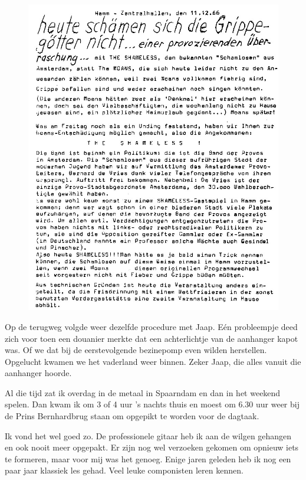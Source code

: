 \documentclass[10pt,twoside, openright]{memoir}
\begin{document}
\begin{figure}
\includegraphics[width=\textwidth]{img/ch30/schamensich}
\end{figure}

Op de terugweg volgde weer dezelfde procedure met Jaap. Eén probleempje deed zich voor toen een douanier merkte dat een achterlichtje van de aanhanger kapot was. Of we dat bij de eerstevolgende bezinepomp even wilden herstellen. Opgelucht kwamen we het vaderland weer binnen. Zeker Jaap, die alles vanuit die aanhanger hoorde.

Al die tijd zat ik overdag in de metaal in Spaarndam en dan in het weekend spelen. Dan kwam ik om 3 of 4 uur ’s nachts thuis en moest om 6.30 uur weer bij de Prins Bernhardbrug staan om opgepikt te worden voor de dagtaak. 

Ik vond het wel goed zo. De professionele gitaar heb ik aan de wilgen gehangen en ook nooit meer opgepakt. Er zijn nog wel verzoeken gekomen om opnieuw iets te formeren, maar voor mij was het genoeg. Enige jaren geleden heb ik nog een paar jaar klassiek les gehad. Veel leuke componisten leren kennen.
\end{document}
